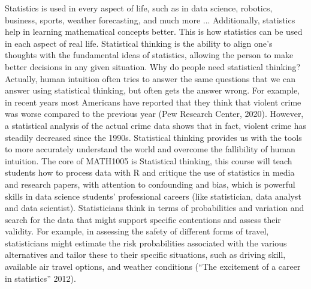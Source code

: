 \documentclass[12pt]{article}
\begin{document}
Statistics is used in every aspect of life, such as in data science, robotics, business, sports, weather forecasting, and much more ... Additionally, statistics help in learning mathematical concepts better. This is how statistics can be used in each aspect of real life. Statistical thinking is the ability to align one’s thoughts with the fundamental ideas of statistics, allowing the person to make better decisions in any given situation. Why do people need statistical thinking? Actually, human intuition often tries to answer the same questions that we can answer using statistical thinking, but often gets the answer wrong. For example, in recent years most Americans have reported that they think that violent crime was worse compared to the previous year (Pew Research Center, 2020). However, a statistical analysis of the actual crime data shows that in fact, violent crime has steadily decreased since the 1990s. Statistical thinking provides us with the tools to more accurately understand the world and overcome the fallibility of human intuition. The core of MATH1005 is Statistical thinking, this course will teach students how to process data with R and critique the use of statistics in media and research papers, with attention to confounding and bias, which is powerful skills in data science students' professional careers (like statistician, data analyst and data scientist). Statisticians think in terms of probabilities and variation and search for the data that might support specific contentions and assess their validity. For example, in assessing the safety of different forms of travel, statisticians might estimate the risk probabilities associated with the various alternatives and tailor these to their specific situations, such as driving skill, available air travel options, and weather conditions (“The excitement of a career in statistics” 2012).
\end{document}
